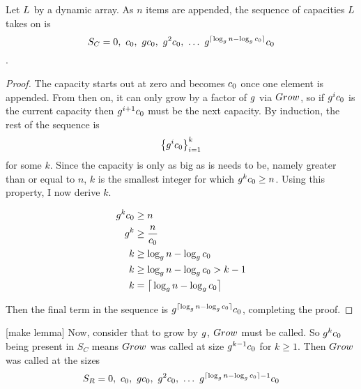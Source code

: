 \begin{lemma}
\label{lem:CapacitySequence}
	Let $L$ by a dynamic array. As $n$ items are appended, the sequence of capacities $L$ takes on is $$S_C = 0,\ \VarInitCapacity,\ \VarGrowthFactor\VarInitCapacity,\ \VarGrowthFactor^2\VarInitCapacity,\ \ldots\ \VarGrowthFactor^{\lceil \log_{\VarGrowthFactor} n - \log_{\VarGrowthFactor} \VarInitCapacity \rceil}\VarInitCapacity$$.
\end{lemma}

\begin{proof}
	The capacity starts out at zero and becomes $c_0$ once one element is appended. From then on, it can only grow by a factor of $g$ via $Grow$, so if $g^ic_0$ is the current capacity then $g^{i + 1}c_0$ must be the next capacity. By induction, the rest of the sequence is $$\left\{ g^ic_0 \right\}_{i = 1}^k$$ for some $k$. Since the capacity is only as big as is needs to be, namely greater than or equal to $n$, $k$ is the smallest integer for which $g^kc_0 \geq n$. Using this property, I now derive $k$.
	
	\begin{align*}
	g^kc_0 &\geq n\\
	g^k &\geq \frac{n}{c_0}\\
	k &\geq \log_{g} n - \log_{g} c_0\\
	k &\geq \log_{g} n - \log_{g} c_0 > k - 1\\
	k &= \big\lceil \log_{g} n - \log_{g} c_0 \big\rceil
	\end{align*}
	
	Then the final term in the sequence is $g^{\lceil \log_{g} n - \log_{g} c_0 \rceil}c_0$, completing the proof.
\end{proof}

[make lemma]
Now, consider that to grow by $g$, $Grow$ must be called. So $g^kc_0$ being present in $S_C$ means $Grow$ was called at size $g^{k - 1}c_0$ for $k \geq 1$. Then $Grow$ was called at the sizes $$S_R = 0,\ \VarInitCapacity,\ \VarGrowthFactor\VarInitCapacity,\ \VarGrowthFactor^2\VarInitCapacity,\ \ldots\ \VarGrowthFactor^{\lceil \log_{\VarGrowthFactor} n - \log_{\VarGrowthFactor} \VarInitCapacity \rceil - 1}\VarInitCapacity$$

